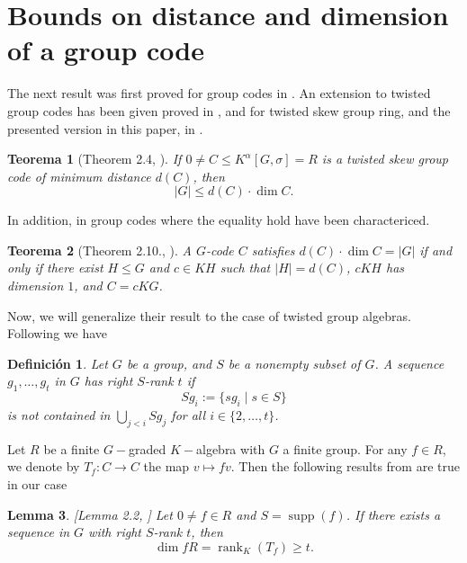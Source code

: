 \documentclass{article}
\newtheorem{theorem}{Teorema}
\newtheorem{lemma}[theorem]{Lemma}
\newtheorem{definition}{Definición}
\DeclareMathOperator{\rank}{rank}
\DeclareMathOperator{\supp}{supp}
\begin{document}
\section{Bounds on distance and dimension of a group code} 
The next result was first proved for group codes in \cite{Borello2022Ideals}. An extension to twisted group codes has been given proved in \cite{WillemsTwistedToAppear}, and for twisted skew group ring, and the presented version in this paper, in \cite{Behajaina2024Twisted}. 

\begin{theorem} [Theorem 2.4, \cite{Behajaina2024Twisted}]
    If $0 \neq C \le K^\alpha[G,\sigma] = R$ is a twisted skew group code
of minimum distance $d(C)$, then
\[
|G| \le d(C)\cdot \dim C.
\]

\end{theorem}
In addition, in \cite{Borello2022Ideals} group codes where the equality hold have been charactericed.
\begin{theorem}[Theorem 2.10., \cite{Borello2022Ideals}]
    A $G$-code $C$ satisfies $d(C)\cdot \dim C = |G|$ if and only if there exist
$H \le G$ and $c \in K H$ such that $|H| = d(C)$, $c K H$ has dimension $1$,
and $C = c K G$.
\end{theorem}

Now, we will generalize their result to the case of twisted group algebras. Following \cite{FengHollmannXiang2019} we have

\begin{definition}
Let $G$ be a group, and $S$ be a nonempty subset of $G$. A sequence $g_1,\dots,g_t$ in $G$ has right $S$-rank $t$ if
\[
S g_i := \{ s g_i \mid s \in S \}
\]
is not contained in $\bigcup_{j<i} S g_j$ for all $i \in \{2,\dots,t\}$.
\end{definition}

Let $R$ be a finite $G-$graded $K-$algebra with $G$ a finite group. For any $f \in R$, we denote by $T_f \colon  C \to  C$ the map
$v \mapsto f v$. Then the following results from \cite{Borello2022Ideals} are true in our case

\begin{lemma} \label{lemmasequence} [Lemma 2.2, \cite{Borello2022Ideals}]
Let $0 \neq f \in R$ and $S = \supp(f)$. If there exists a sequence in $G$
with right $S$-rank $t$, then
\[
\dim f  R = \rank_K(T_f) \ge t.
\]
\end{lemma}
\end{document}
